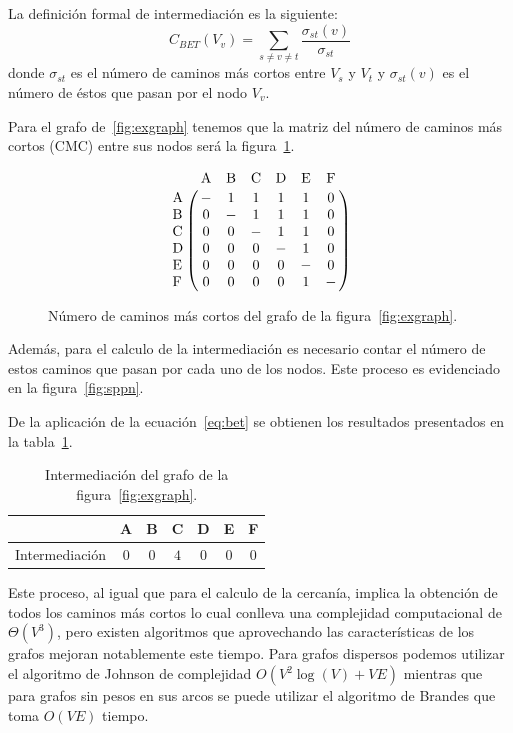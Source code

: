La definición formal de intermediación es la siguiente:
\begin{equation}
  \label{eq:bet}
  C_{BET}(V_v) = \sum_{s\neq v\neq t} \frac{\sigma_{st}(v)}{\sigma_{st}}
\end{equation}
donde $\sigma_{st}$ es el número de caminos más cortos entre $V_s$ y $V_t$ y 
$\sigma_{st}(v)$ es el número de éstos que pasan por el nodo $V_v$.

Para el grafo de~\ref{fig:exgraph} tenemos que la matriz del número de caminos
más cortos (CMC) entre sus nodos será la figura~\ref{fig:nrosp}.

\begin{figure}[htpb]
  \begin{equation*}
    \bordermatrix{
       ~  & $A$ & $B$ & $C$ & $D$ & $E$ & $F$ \cr
      $A$ &  -  &  1  &  1  &  1  &  1  &  0  \cr
      $B$ &  0  &  -  &  1  &  1  &  1  &  0  \cr
      $C$ &  0  &  0  &  -  &  1  &  1  &  0  \cr
      $D$ &  0  &  0  &  0  &  -  &  1  &  0  \cr
      $E$ &  0  &  0  &  0  &  0  &  -  &  0  \cr
      $F$ &  0  &  0  &  0  &  0  &  1  &  -  \cr
    }
  \end{equation*}
  \caption{Número de caminos más cortos del grafo de la figura~\ref{fig:exgraph}.}
  \label{fig:nrosp}
\end{figure}

Además, para el calculo de la intermediación es necesario contar el número de
estos caminos que pasan por cada uno de los nodos.
Este proceso es evidenciado en la figura~\ref{fig:sppn}.



De la aplicación de la ecuación~\ref{eq:bet} se obtienen los resultados
presentados en la tabla~\ref{tab:exbet}.

\begin{table}[h!]
  \centering
  \begin{tabular}{|l|c|c|c|c|c|c|}
    \hline         &  A  &  B  &  C  &  D  &  E  &  F  \\\hline
    Intermediación & $0$ & $0$ & $4$ & $0$ & $0$ & $0$ \\\hline
  \end{tabular}
  \caption{Intermediación del grafo de la figura~\ref{fig:exgraph}.}
  \label{tab:exbet}
\end{table}

Este proceso, al igual que para el calculo de la cercanía, implica la obtención
de todos los caminos más cortos lo cual conlleva una complejidad computacional
de $\Theta (V^3)$, pero existen algoritmos que aprovechando las características
de los grafos mejoran notablemente este tiempo. Para grafos dispersos podemos
utilizar el algoritmo de Johnson\cite{johnson1977efficient} de complejidad 
$O(V^2\log (V) + VE)$ mientras que para grafos sin pesos en sus arcos se puede
utilizar el algoritmo de Brandes\cite{brandes2001faster} que toma $O(VE)$
tiempo.

